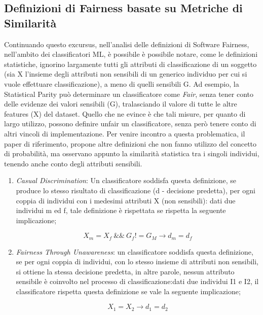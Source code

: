  \subsection{Definizioni di Fairness basate su Metriche di Similarità}
 
 Continuando questo excursus, nell'analisi delle definizioni di Software Fairness, nell'ambito dei classificatori ML, è possibile è possibile notare, come le definizioni statistiche, ignorino largamente tutti gli attributi di classificazione di un soggetto (sia X l'insieme degli attributi non sensibili di un generico individuo per cui si vuole effettuare classificazione), a meno di quelli sensibili G. Ad esempio, la Statistical Parity può determinare un classificatore come \emph{Fair}, senza tener conto delle evidenze dei valori sensibili (G), tralasciando il valore di tutte le altre features (X) del dataset. Quello che ne evince è che tali misure, per quanto di largo utilizzo, possono definire unfair un classificatore, senza però tenere conto di altri vincoli di implementazione\cite{FairnessDefinitionExplained}. Per venire incontro a questa problematica, il paper di riferimento, propone altre definizioni che non fanno utilizzo del concetto di probabilità, ma osservano appunto la similarità statistica tra i singoli individui, tenendo anche conto degli attributi sensibili\cite{FairnessDefinitionExplained}.\\
 
 \begin{enumerate}
     \item \emph{Casual Discrimination}: Un classificatore soddisfa questa definizione, se produce lo stesso risultato di classificazione (d - decisione predetta), per ogni coppia di individui con i medesimi attributi X (non sensibili): dati due individui m ed f, tale definizione è rispettata se rispetta la seguente implicazione;  
     
     
     \begin{equation*}
    X_m = X_f \ \&\& \ G_f != G_M \xrightarrow{} d_m = d_f
    \end{equation*} 

     \item \emph{Fairness Through Unawareness}: un classificatore soddisfa questa definizione, se per ogni coppia di individui, con lo stesso insieme di attributi non sensibili, si ottiene la stessa decisione predetta, in altre parole, nessun attributo sensibile è coinvolto nel processo di classificazione:dati due individui I1 e I2, il classificatore rispetta questa definizione se vale la seguente implicazione;  
     
         
     \begin{equation*}
        X_1 = X_2 \xrightarrow{} d_1 = d_2
    \end{equation*} 
 \end{enumerate}
 

